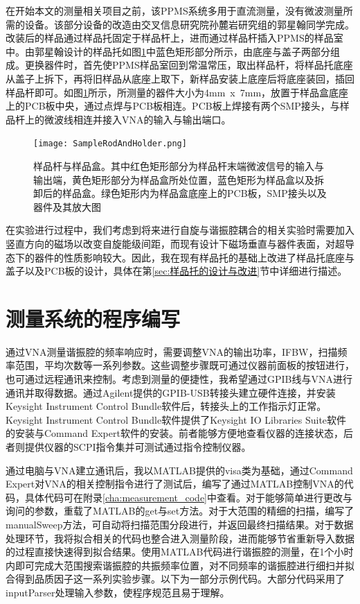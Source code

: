             在开始本文的测量相关项目之前，该PPMS系统多用于直流测量，没有微波测量所需的设备。该部分设备的改造由交叉信息研究院孙麓岩研究组的郭星翰同学完成。改装后的样品通过样品托固定于样品杆上，进而通过样品杆插入PPMS的样品室中。由郭星翰设计的样品托如图\ref{fig:samplerodHolder}中蓝色矩形部分所示，由底座与盖子两部分组成。更换器件时，首先使PPMS样品室回到常温常压，取出样品杆，将样品托底座从盖子上拆下，再将旧样品从底座上取下，新样品安装上底座后将底座装回，插回样品杆即可。如图\ref{fig:samplerodHolder}所示，所测量的器件大小为4mm~x~7mm，放置于样品盒底座上的PCB板中央，通过点焊与PCB板相连。PCB板上焊接有两个SMP接头，与样品杆上的微波线相连并接入VNA的输入与输出端口。


\begin{figure}[h]
  \centering%
  \texttt{[image: SampleRodAndHolder.png]}
  \caption{样品杆与样品盒。其中红色矩形部分为样品杆末端微波信号的输入与输出端，黄色矩形部分为样品盒所处位置，蓝色矩形为样品盒以及拆卸后的样品盒。绿色矩形内为样品盒底座上的PCB板，SMP接头以及器件及其放大图}
  \label{fig:samplerodHolder}
\end{figure}

            在实验进行过程中，我们考虑到将来进行自旋与谐振腔耦合的相关实验时需要加入竖直方向的磁场以改变自旋能级间距，而现有设计下磁场垂直与器件表面，对超导态下的器件的性质影响较大。因此，我在现有样品托的基础上改进了样品托底座与盖子以及PCB板的设计，具体在第\ref{sec:样品托的设计与改进}节中详细进行描述。
                

            \section{测量系统的程序编写} %
            \label{sec:测量系统}
            通过VNA测量谐振腔的频率响应时，需要调整VNA的输出功率，IFBW，扫描频率范围，平均次数等一系列参数。这些调整步骤既可通过仪器前面板的按钮进行，也可通过远程通讯来控制。考虑到测量的便捷性，我希望通过GPIB线与VNA进行通讯并取得数据。通过Agilent提供的GPIB-USB转接头建立硬件连接，并安装Keysight Instrument Control Bundle软件后，转接头上的工作指示灯正常。Keysight Instrument Control Bundle软件提供了Keysight IO Libraries Suite软件的安装与Command Expert软件的安装。前者能够方便地查看仪器的连接状态，后者则提供仪器的SCPI指令集并可测试通过指令控制仪器。

            通过电脑与VNA建立通讯后，我以MATLAB提供的visa类为基础，通过Command Expert对VNA的相关控制指令进行了测试后，编写了通过MATLAB控制VNA的代码，具体代码可在附录\ref{cha:measurement_code}中查看。对于能够简单进行更改与询问的参数，重载了MATLAB的get与set方法。对于大范围的精细的扫描，编写了manualSweep方法，可自动将扫描范围分段进行，并返回最终扫描结果。对于数据处理环节，我将拟合相关的代码也整合进入测量阶段，进而能够节省重新导入数据的过程直接快速得到拟合结果。使用MATLAB代码进行谐振腔的测量，在1个小时内即可完成大范围搜索谐振腔的共振频率位置，对不同频率的谐振腔进行细扫并拟合得到品质因子这一系列实验步骤。以下为一部分示例代码。大部分代码采用了inputParser处理输入参数，使程序规范且易于理解。

